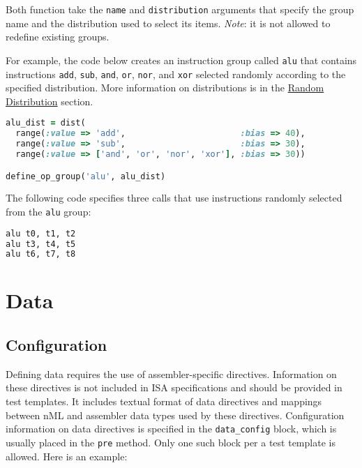 \documentclass[oneside,final,12pt]{extreport}
\begin{document}
Both function take the \texttt{name} and \texttt{distribution} arguments that specify
the group name and the distribution used to select its items. \emph{Note}: it is not
allowed to redefine existing groups.

For example, the code below creates an instruction group called \texttt{alu} that contains
instructions \texttt{add}, \texttt{sub}, \texttt{and}, \texttt{or}, \texttt{nor}, and \texttt{xor}
selected randomly according to the specified distribution. More information on
distributions is in the \hyperref[Random_Distribution]{Random Distribution} section.

\begin{lstlisting}[language=ruby]
alu_dist = dist(
  range(:value => 'add',                       :bias => 40),
  range(:value => 'sub',                       :bias => 30),
  range(:value => ['and', 'or', 'nor', 'xor'], :bias => 30))

define_op_group('alu', alu_dist)
\end{lstlisting}

The following code specifies three calls that use instructions randomly selected
from the \texttt{alu} group:
 
\begin{lstlisting}[language=ruby]
alu t0, t1, t2
alu t3, t4, t5
alu t6, t7, t8
\end{lstlisting}


\section{Data}

\subsection{Configuration}

Defining data requires the use of assembler-specific directives. Information on
these directives is not included in ISA specifications and should be provided in test
templates. It includes textual format of data directives and mappings between nML and
assembler data types used by these directives. Configuration information on data
directives is specified in the \texttt{data{\_}config} block, which is usually placed
in the \texttt{pre} method. Only one such block per a test template is allowed.
Here is an example:
\end{document}
